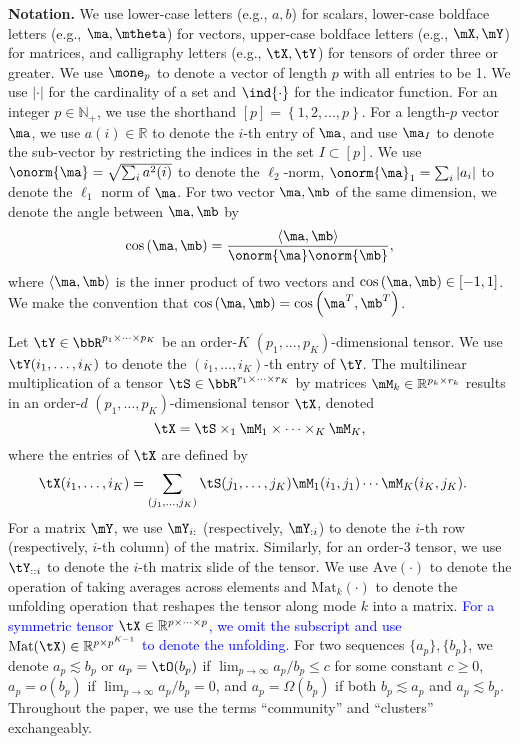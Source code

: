 \documentclass[lettersize,onecolumn,journal]{IEEEtran}
\theoremstyle{definition}
\theoremstyle{definition}
\newcommand{\of}[1]{\left(#1\right)}
\newcommand{\offf}[1]{\left\{#1\right\}}
\newcommand{\ang}[1]{\left\langle#1\right\rangle}
\begin{document}
{\bf Notation.} We use lower-case letters (e.g., $a,b$) for scalars, lower-case boldface letters (e.g., $\ma,\mtheta$) for vectors, upper-case boldface letters (e.g., $\mX,\mY$) for matrices, and calligraphy letters (e.g., $\tX,\tY$) for tensors of order three or greater. We use $\mone_p$ to denote a vector of length $p$ with all entries to be 1. We use $|\cdot|$ for the cardinality of a set and $\ind\{\cdot\}$ for the indicator function. For an integer $p\in\mathbb{N}_{+}$, we use the shorthand $[p]= \offf{1,2,...,p}$. For a length-$p$ vector $\ma$, we use $a(i)\in\mathbb{R}$ to denote the $i$-th entry of $\ma$, and use $\ma_{I}$ to denote the sub-vector by restricting the indices in the set $I\subset [p]$.  We use  $\onorm{\ma}=\sqrt{\sum_{i}a^2(i)}$ to denote the $\ell_2$-norm, $\onorm{\ma}_1=\sum_i |a_i|$ to denote the $\ell_1$ norm of $\ma$. For two vector $\ma, \mb$ of the same dimension, we denote the angle between $\ma, \mb$ by 
\begin{equation}
    \cos \of{\ma, \mb} = \frac{\ang{ \ma, \mb}}{ \onorm{\ma} \onorm{\mb} },
\end{equation}
where $\ang{\ma,\mb}$ is the inner product of two vectors and $\cos \of{\ma, \mb} \in [-1,1]$. We make the convention that $\cos \of{\ma, \mb} = \cos \of{\ma^T, \mb^T}$. 

Let $\tY  \in \bbR^{p_1 \times \cdots \times p_K}$ be an order-$K$ $(p_1,...,p_K)$-dimensional tensor. We use $\tY(i_1,\ldots,i_K)$ to denote the $(i_1,\ldots,i_K)$-th entry of $\tY$. The multilinear multiplication of a tensor $\tS\in \bbR^{r_1\times \cdots \times r_K}$ by matrices $\mM_k \in\mathbb{R}^{p_k\times r_k}$ results in an order-$d$ $(p_1,\ldots,p_K)$-dimensional tensor $\tX$, denoted
\[
\tX=\tS \times_1 \mM_1 \times \cdots \times_K \mM_K,
\]
where the entries of $\tX$ are defined by
\begin{align}
    &\tX(i_1,\ldots, i_K)=\sum_{(j_1,\ldots,j_K)}\tS(j_1,\ldots,j_K)\mM_1(i_1,j_1)\cdots \mM_K(i_K,j_K).
\end{align} 
For a matrix $\mY$, we use $\mY_{i:}$ (respectively, $\mY_{:i}$) to denote the $i$-th row (respectively, $i$-th column) of the matrix. Similarly, for an order-3 tensor, we use $\tY_{::i}$ to denote the $i$-th matrix slide of the tensor. We use $\text{Ave}(\cdot)$ to denote the operation of taking averages across elements and $\text{Mat}_k(\cdot)$ to denote the unfolding operation that reshapes the tensor along mode $k$ into a matrix. \textcolor{blue}{For a symmetric tensor $\tX \in\mathbb{R}^{p\times \cdots \times p}$, we omit the subscript and use $\text{Mat}(\tX)\in\mathbb{R}^{p\times p^{K-1}}$ to denote the unfolding.}  For two sequences $\{a_p\}, \{b_p\}$, we denote $a_p\lesssim b_p$ or $a_p=\tO(b_p)$ if $\lim_{p\to\infty}a_p /b_p\leq c$ for some constant $c\geq 0$, $a_p=o(b_p)$ if $\lim_{p\to\infty}a_p/b_p =0$, and $a_p = \Omega(b_p)$ if both $b_p \lesssim a_p$ and $a_p\lesssim b_p$. Throughout the paper, we use the terms ``community'' and ``clusters'' exchangeably. 
\end{document}
